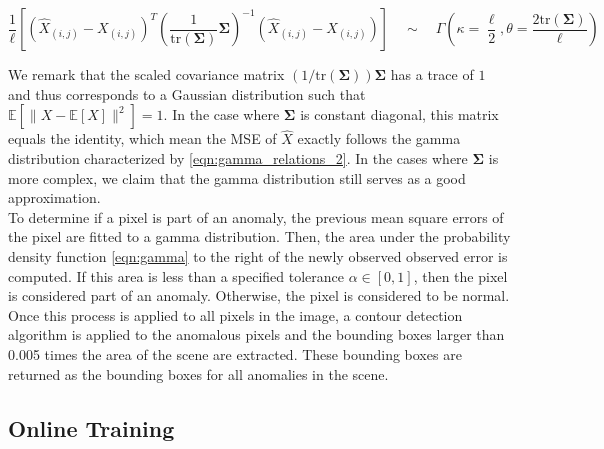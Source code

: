 \documentclass[12pt]{article}
\begin{document}
\begin{equation}
\frac{1}{\ell}\left[(\hat{X}_{(i,j)} - X_{(i,j)})^T\left(\frac{1}{\text{tr}(\mathbf{\Sigma})}\mathbf{\Sigma}\right)^{-1}(\hat{X}_{(i,j)} - X_{(i,j)})\right] \quad \sim\quad \Gamma\left(\kappa = \frac{\ell}{2}, \theta = \frac{2\text{tr}(\mathbf{\Sigma})}{\ell}\right)
\label{eqn:gamma_relations_2} 
\end{equation}

We remark that the scaled covariance matrix $(1/\text{tr}(\mathbf{\Sigma}))\mathbf{\Sigma}$ has a trace of $1$ and thus corresponds to a Gaussian distribution such that $\mathbb{E}[\lVert X - \mathbb{E}[X] \rVert^2] = 1$. In the case where $\mathbf{\Sigma}$ is constant diagonal, this matrix equals the identity, which mean the MSE of $\hat{X}$ exactly follows the gamma distribution characterized by \eqref{eqn:gamma_relations_2}. In the cases where $\mathbf{\Sigma}$ is more complex, we claim that the gamma distribution still serves as a good approximation.\\

To determine if a pixel is part of an anomaly, the previous mean square errors of the pixel are fitted to a gamma distribution. Then, the area under the probability density function \eqref{eqn:gamma} to the right of the newly observed observed error is computed. If this area is less than a specified tolerance $\alpha \in [0,1]$, then the pixel is considered part of an anomaly. Otherwise, the pixel is considered to be normal. Once this process is applied to all pixels in the image, a contour detection algorithm is applied to the anomalous pixels and the bounding boxes larger than 0.005 times the area of the scene are extracted. These bounding boxes are returned as the bounding boxes for all anomalies in the scene.

\subsection{Online Training}
\end{document}
